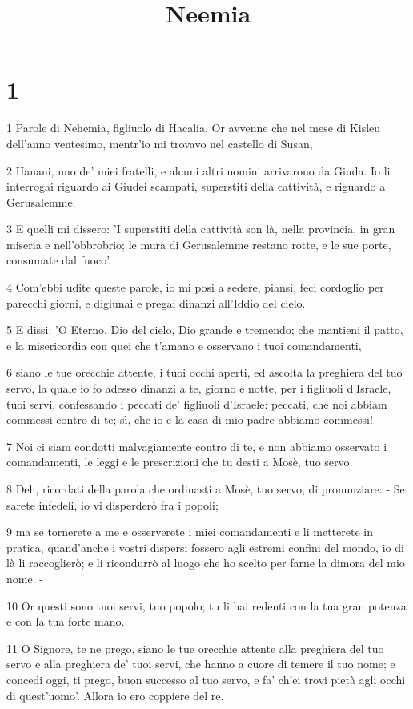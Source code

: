 

\title{Neemia}


\chapter{1}

\par 1 Parole di Nehemia, figliuolo di Hacalia. Or avvenne che nel mese di Kisleu dell'anno ventesimo, mentr'io mi trovavo nel castello di Susan,
\par 2 Hanani, uno de' miei fratelli, e alcuni altri uomini arrivarono da Giuda. Io li interrogai riguardo ai Giudei scampati, superstiti della cattività, e riguardo a Gerusalemme.
\par 3 E quelli mi dissero: 'I superstiti della cattività son là, nella provincia, in gran miseria e nell'obbrobrio; le mura di Gerusalemme restano rotte, e le sue porte, consumate dal fuoco'.
\par 4 Com'ebbi udite queste parole, io mi posi a sedere, piansi, feci cordoglio per parecchi giorni, e digiunai e pregai dinanzi all'Iddio del cielo.
\par 5 E dissi: 'O Eterno, Dio del cielo, Dio grande e tremendo; che mantieni il patto, e la misericordia con quei che t'amano e osservano i tuoi comandamenti,
\par 6 siano le tue orecchie attente, i tuoi occhi aperti, ed ascolta la preghiera del tuo servo, la quale io fo adesso dinanzi a te, giorno e notte, per i figliuoli d'Israele, tuoi servi, confessando i peccati de' figliuoli d'Israele: peccati, che noi abbiam commessi contro di te; sì, che io e la casa di mio padre abbiamo commessi!
\par 7 Noi ci siam condotti malvagiamente contro di te, e non abbiamo osservato i comandamenti, le leggi e le prescrizioni che tu desti a Mosè, tuo servo.
\par 8 Deh, ricordati della parola che ordinasti a Mosè, tuo servo, di pronunziare: - Se sarete infedeli, io vi disperderò fra i popoli;
\par 9 ma se tornerete a me e osserverete i miei comandamenti e li metterete in pratica, quand'anche i vostri dispersi fossero agli estremi confini del mondo, io di là li raccoglierò; e li ricondurrò al luogo che ho scelto per farne la dimora del mio nome. -
\par 10 Or questi sono tuoi servi, tuo popolo; tu li hai redenti con la tua gran potenza e con la tua forte mano.
\par 11 O Signore, te ne prego, siano le tue orecchie attente alla preghiera del tuo servo e alla preghiera de' tuoi servi, che hanno a cuore di temere il tuo nome; e concedi oggi, ti prego, buon successo al tuo servo, e fa' ch'ei trovi pietà agli occhi di quest'uomo'. Allora io ero coppiere del re.

